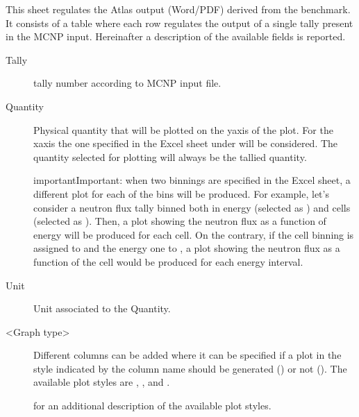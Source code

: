 \documentclass[letterpaper,10pt,english]{sphinxmanual}
\begin{document}
\sphinxAtStartPar
This sheet regulates the Atlas output (Word/PDF) derived from the benchmark. It consists of a table where each row regulates
the output of a single tally present in the MCNP input.
Hereinafter a description of the available fields is reported.
\begin{description}
\item[{Tally}] \leavevmode
\sphinxAtStartPar
tally number according to MCNP input file.

\item[{Quantity}] \leavevmode
\sphinxAtStartPar
Physical quantity that will be plotted on the y\sphinxhyphen{}axis of the plot. For the x\sphinxhyphen{}axis the one specified in the Excel sheet
under  will be considered. The quantity selected for plotting will always be the tallied quantity.

\begin{sphinxadmonition}{important}{Important:}
\sphinxAtStartPar
when two binnings are specified in the Excel sheet, a different plot for each of the  bins will be produced.
For example, let’s consider a neutron flux tally binned both in energy (selected as ) and cells (selected as ).
Then, a plot showing the neutron flux as a function of energy will be produced for each cell. On the contrary, if the cell
binning is assigned to  and the energy one to , a plot showing the neutron flux as a function of the cell would
be produced for each energy interval.
\end{sphinxadmonition}

\item[{Unit}] \leavevmode
\sphinxAtStartPar
Unit associated to the Quantity.

\item[{\textless{}Graph type\textgreater{}}] \leavevmode
\sphinxAtStartPar
Different columns can be added where it can be specified if a plot in the style indicated by the column name
should be generated () or not (). The available plot styles are , ,
 and .


\nopagebreak


\sphinxAtStartPar
{\hyperref[\detokenize{usage/postprocessing:plotstyles}]{}} for an additional description of the available plot styles.



\end{description}
\end{document}
